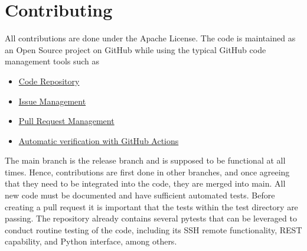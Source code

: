 
\section{Contributing}\label{contributing}

All contributions are done under the Apache License.  The code is
maintained as an Open Source project on GitHub while using the typical
GitHub code management tools such as

\begin{itemize}
\item
  \href{https://github.com/cloudmesh/cloudmesh-cc}{Code Repository}
\item
  \href{https://github.com/cloudmesh/cloudmesh-cc/issues}{Issue Management}
\item
  \href{https://github.com/cloudmesh/cloudmesh-cc/pulls}{Pull Request Management}
\item
  \href{https://github.com/cloudmesh/cloudmesh-cc/actions}{Automatic verification with GitHub Actions}
\end{itemize}

The main branch is the release branch and is supposed to be functional
at all times. Hence, contributions are first done in other branches,
and once agreeing that they need to be integrated into the code, they
are merged into main. All new code must be documented and have
sufficient automated tests.  Before creating a pull request it is
important that the tests within the test directory are passing.  The
repository already contains several pytests that can be leveraged to
conduct routine testing of the code, including its SSH remote
functionality, REST capability, and Python interface, among others.
